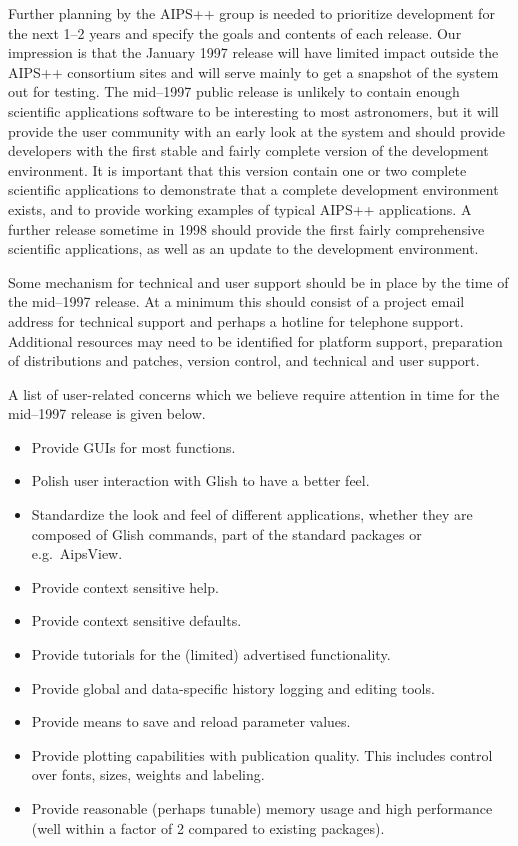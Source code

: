 Further planning by the AIPS++ group is needed to prioritize
development for the next 1--2 years and specify the goals and contents
of each release.  Our impression is that the January 1997 release will
have limited impact outside the AIPS++ consortium sites and will serve
mainly to get a snapshot of the system out for testing.  The mid--1997
public release is unlikely to contain enough scientific applications
software to be interesting to most astronomers, but it will provide
the user community with an early look at the system and should provide
developers with the first stable and fairly complete version of the
development environment.  It is important that this version contain
one or two complete scientific applications to demonstrate that a
complete development environment exists, and to provide working
examples of typical AIPS++ applications.  A further release sometime
in 1998 should provide the first fairly comprehensive scientific
applications, as well as an update to the development environment.

Some mechanism for technical and user support should be in place by
the time of the mid--1997 release.  At a minimum this should consist
of a project email address for technical support and perhaps a hotline for
telephone support.  Additional resources may need to be identified for
platform support, preparation of distributions and patches, version
control, and technical and user support.

A list of user-related concerns which we believe require attention in
time for the mid--1997 release is given below.

\begin{itemize}
\item Provide GUIs for most functions.

\item Polish user interaction with Glish to have a better feel. 

\item Standardize the look and feel of different applications,
whether they are composed of Glish commands, part of the standard
packages or e.g.\ AipsView.

\item Provide context sensitive help.

\item Provide context sensitive defaults.

\item Provide tutorials for the (limited) advertised functionality.

\item Provide global and data-specific history logging and editing tools.

\item Provide means to save and reload parameter values.

\item Provide plotting capabilities with publication quality. This
includes control over fonts, sizes, weights and labeling.

\item Provide reasonable (perhaps tunable) memory usage and high 
performance (well within a factor of 2 compared to existing packages).
\end{itemize}

